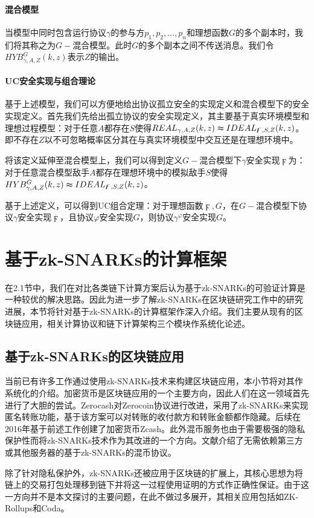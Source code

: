 \paragraph{混合模型}
当模型中同时包含运行协议$\gamma$的参与方$p_1, p_2, \dots , p_n$和理想函数$G$的多个副本时，我们将其称之为$G-$混合模型。此时$G$的多个副本之间不传送消息。我们令$HYB^G_{\gamma, A, Z}(k, z)$表示$Z$的输出。
\paragraph{UC安全实现与组合理论}
基于上述模型，我们可以方便地给出协议孤立安全的实现定义和混合模型下的安全实现定义。首先我们先给出孤立协议的安全实现定义，其主要基于真实环境模型和理想过程模型：对于任意$A$都存在$S$使得$REAL_{\gamma, A, Z}(k, z) \thickapprox IDEAL_{\digamma, S, Z}(k, z)$。即不存在$Z$以不可忽略概率区分其在与真实环境模型中交互还是在理想环境中。

将该定义延伸至混合模型上，我们可以得到定义$G-$混合模型下$\gamma$安全实现$\digamma$为：对于任意混合模型敌手$A$都存在理想环境中的模拟敌手$S$使得$HYB^G_{\gamma, A, Z}(k, z) \thickapprox IDEAL_{\digamma, S, Z}(k, z)$。

基于上述定义，可以得到UC组合定理：对于理想函数$\digamma, G$，在$G-$混合模型下协议$\gamma$安全实现$\digamma$，且协议$\varphi$安全实现$G$，则协议$\gamma^\varphi$安全实现$G$。
\section{基于zk-SNARKs的计算框架}
在2.1节中，我们在对比各类链下计算方案后认为基于zk-SNARKs的可验证计算是一种较优的解决思路。因此为进一步了解zk-SNARKs在区块链研究工作中的研究进展，本节将针对基于zk-SNARKs的计算框架作深入介绍。我们主要从现有的区块链应用，相关计算协议和链下计算架构三个模块作系统化论述。
\subsection{基于zk-SNARKs的区块链应用}
当前已有许多工作通过使用zk-SNARKs技术来构建区块链应用，本小节将对其作系统化的介绍。加密货币是区块链应用的一个主要方向，因此人们在这一领域首先进行了大胆的尝试。Zerocash\cite{6956581}对Zerocoin协议\cite{6547123}进行改进，采用了zk-SNARKs来实现匿名转账功能，基于该方案可以对转账的收付款方和转账金额都作隐藏。后续在2016年基于前述工作创建了加密货币Zcash\cite{Zcash}。此外混币服务也由于需要极强的隐私保护性而将zk-SNARKs技术作为其改进的一个方向。文献\cite{2020arXiv201001056L}介绍了无需依赖第三方或其他服务器的基于zk-SNARKs的混币协议。

除了针对隐私保护外，zk-SNARKs还被应用于区块链的扩展上，其核心思想为将链上的交易打包处理移到链下并将这一过程使用证明的方式作正确性保证。由于这一方向并不是本文探讨的主要问题，在此不做过多展开，其相关应用包括如ZK-Rollups\cite{zkrollups}和Coda\cite{cryptoeprint:2020/352}。
